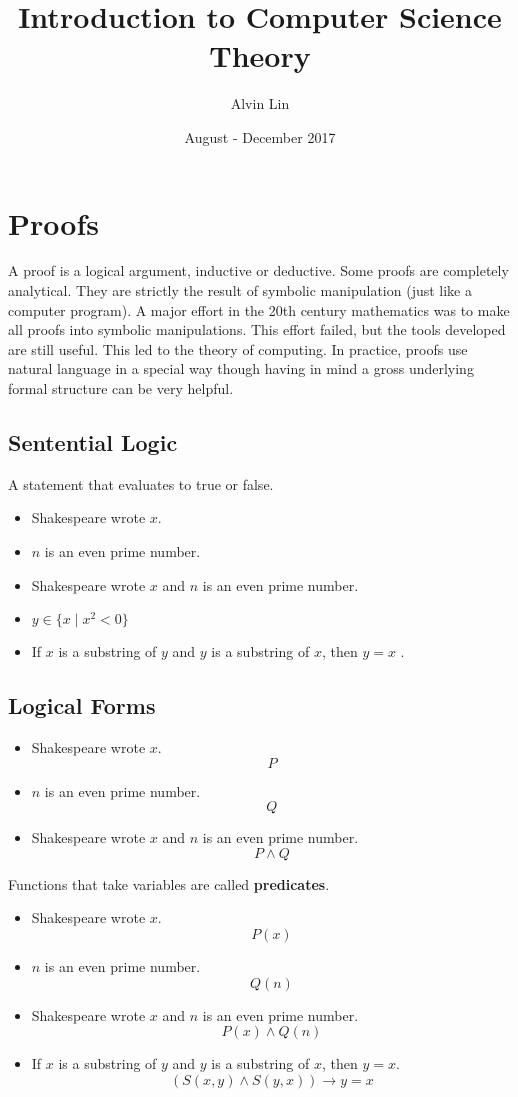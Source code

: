 \documentclass[letterpaper, 12pt]{math}
\title{Introduction to Computer Science Theory}
\author{Alvin Lin}
\date{August - December 2017}
\begin{document}
\maketitle

\section*{Proofs}
A proof is a logical argument, inductive or deductive. Some proofs are
completely analytical. They are strictly the result of symbolic manipulation
(just like a computer program). A major effort in the 20th century mathematics
was to make all proofs into symbolic manipulations. This effort failed, but the
tools developed are still useful. This led to the theory of computing. In
practice, proofs use natural language in a special way though having in mind
a gross underlying formal structure can be very helpful.

\subsection*{Sentential Logic}
A statement that evaluates to true or false.
\begin{itemize}
  \item Shakespeare wrote \( x \).
  \item \( n \) is an even prime number.
  \item Shakespeare wrote \( x \) and \( n \) is an even prime number.
  \item \( y\in\{x\mid x^2<0\} \)
  \item If \( x \) is a substring of \( y \) and \( y \) is a substring of
    \( x \), then \( y = x \) .
\end{itemize}

\subsection*{Logical Forms}
\begin{itemize}
  \item Shakespeare wrote \( x \).
    \[ P \]
  \item \( n \) is an even prime number.
    \[ Q \]
  \item Shakespeare wrote \( x \) and \( n \) is an even prime number.
    \[ P\wedge Q \]
\end{itemize}
Functions that take variables are called \textbf{predicates}.
\begin{itemize}
  \item Shakespeare wrote \( x \).
    \[ P(x) \]
  \item \( n \) is an even prime number.
    \[ Q(n) \]
  \item Shakespeare wrote \( x \) and \( n \) is an even prime number.
    \[ P(x)\wedge Q(n) \]
  \item If \( x \) is a substring of \( y \) and \( y \) is a substring of
    \( x \), then \( y = x \).
    \[ (S(x,y)\wedge S(y,x))\to y = x \]
\end{itemize}
\end{document}
